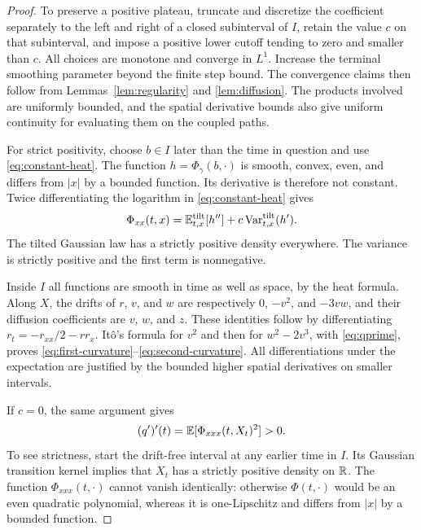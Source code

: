 \begin{proof}
To preserve a positive plateau, truncate and discretize the
coefficient separately to the left and right of a closed subinterval
of $I$, retain the value $c$ on that subinterval, and impose a
positive lower cutoff tending to zero and smaller than $c$.
All choices are monotone and converge in $L^1$.  Increase the terminal
smoothing parameter beyond the finite step bound.  The convergence
claims then follow from Lemmas~\ref{lem:regularity} and
\ref{lem:diffusion}.  The products involved are uniformly bounded,
and the spatial derivative bounds also give uniform continuity for
evaluating them on the coupled paths.

For strict positivity, choose $b\in I$ later than the time in
question and use \eqref{eq:constant-heat}.  The function
$h=\Phi_\gamma(b,\cdot)$ is smooth, convex, even, and differs from
$|x|$ by a bounded function.  Its derivative is therefore not constant.
Twice differentiating the logarithm in \eqref{eq:constant-heat}
gives
\[
 \Phi_{xx}(t,x)=\mathbb E_{t,x}^{\rm tilt}[h'']
                     +c\operatorname{Var}_{t,x}^{\rm tilt}(h').
\]
The tilted Gaussian law has a strictly positive density everywhere.
The variance is strictly positive and the first term is nonnegative.

Inside $I$ all functions are smooth in time as well as space, by
the heat formula.  Along $X$, the drifts of $r$, $v$, and $w$ are
respectively $0$, $-v^2$, and $-3vw$, and their diffusion coefficients
are $v$, $w$, and $z$.  These identities follow by differentiating
$r_t=-r_{xx}/2-rr_x$.  It\^o's formula for $v^2$ and then for
$w^2-2v^3$, with \eqref{eq:qprime}, proves
\eqref{eq:first-curvature}--\eqref{eq:second-curvature}.
All differentiations under the expectation are justified by the
bounded higher spatial derivatives on smaller intervals.

If $c=0$, the same argument gives
\[
 (q')'(t)=\mathbb E[\Phi_{xxx}(t,X_t)^2]>0.
\]
To see strictness, start the drift-free interval at any earlier
time in $I$.  Its Gaussian transition kernel implies that $X_t$ has
a strictly positive density on $\mathbb R$.  The function
$\Phi_{xxx}(t,\cdot)$ cannot vanish identically: otherwise
$\Phi(t,\cdot)$ would be an even quadratic polynomial, whereas it
is one-Lipschitz and differs from $|x|$ by a bounded function.
\end{proof}
